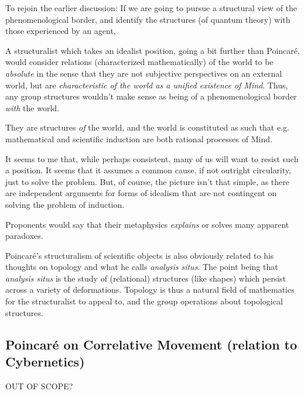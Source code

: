 \documentclass{article}
\begin{document}
To rejoin the earlier discussion: If we are going to pursue a structural view of the phenomenological border, and identify the structures (of quantum theory) with those experienced by an agent, 

A structuralist which takes an idealist position, going a bit further than Poincar\'e, would consider relations (characterized mathematically) of the world to be \emph{absolute} in the sense that they are not subjective perspectives on an external world, but are \emph{characteristic of the world as a unified existence of Mind}.  Thus, any group structures wouldn't make sense as being of a phenomenological border \emph{with} the world.  

They are structures \emph{of} the world, and the world is constituted as such that e.g. mathematical and scientific induction are both rational processes of Mind.  

It seems to me that, while perhaps consistent, many of us will want to resist such a position.  It seems that it assumes a common cause, if not outright circularity, just to solve the problem.  But, of course, the picture isn't that simple, as there are independent arguments for forms of idealism that are not contingent on solving the problem of induction.

Proponents would say that their metaphysics \emph{explains} or solves many apparent paradoxes.

Poincar\'e's structuralism of scientific objects is also obviously related to his thoughts on topology and what he calls \emph{analysis situs}.  The point being that \emph{analysis situs} is the study of (relational) structures (like shapes) which persist across a variety of deformations.  Topology is thus a natural field of mathematics for the structuralist to appeal to, and the group operations about topological structures.

\subsection{Poincar\'e on Correlative Movement (relation to Cybernetics)}

OUT OF SCOPE?
\end{document}
